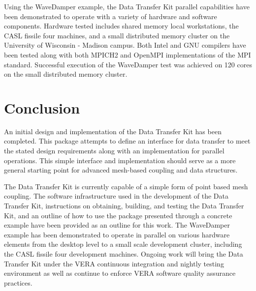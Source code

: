 \documentclass[letterpaper]{article}
\begin{document}
Using the WaveDamper example, the Data Transfer Kit parallel
capabilities have been demonstrated to operate with a variety of
hardware and software components. Hardware tested includes shared
memory local workstations, the CASL fissile four machines, and a small
distributed memory cluster on the University of Wisconsin - Madison
campus. Both Intel and GNU compilers have been tested along with both
MPICH2 and OpenMPI implementations of the MPI standard. Successful
execution of the WaveDamper test was achieved on 120 cores on the
small distributed memory cluster.

\section{Conclusion}
An initial design and implementation of the Data Transfer Kit has been
completed. This package attempts to define an interface for data
transfer to meet the stated design requirements along with an
implementation for parallel operations. This simple interface and
implementation should serve as a more general starting point for
advanced mesh-based coupling and data structures.

The Data Transfer Kit is currently capable of a simple form of point
based mesh coupling. The software infrastructure used in the
development of the Data Transfer Kit, instructions on obtaining,
building, and testing the Data Transfer Kit, and an outline of how to
use the package presented through a concrete example have been
provided as an outline for this work. The WaveDamper example has been
demonstrated to operate in parallel on various hardware elements from
the desktop level to a small scale development cluster, including the
CASL fissile four development machines. Ongoing work will bring the
Data Transfer Kit under the VERA continuous integration and nightly
testing environment as well as continue to enforce VERA software
quality assurance practices.


\pagebreak


\end{document}
